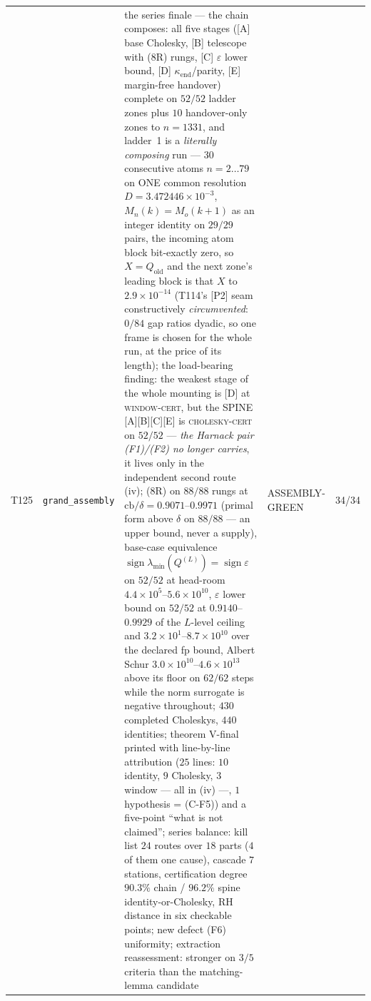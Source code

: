 \documentclass[11pt,a4paper]{article}
\begin{document}
{\begin{xltabular}{\linewidth}{@{}p{0.95cm} >{\raggedright\arraybackslash}p{3.1cm} Y >{\raggedright\scriptsize\arraybackslash}p{3.35cm} p{1.15cm}@{}}
T125 & \texttt{\scriptsize grand\_\allowbreak assembly} & the series finale --- the chain composes: all five stages ([A] base Cholesky, [B] telescope with (8R) rungs, [C] $\varepsilon$ lower bound, [D] $\kappa_{\mathrm{end}}$/parity, [E] margin-free handover) complete on $52/52$ ladder zones plus $10$ handover-only zones to $n=1331$, and ladder~1 is a \emph{literally composing} run --- $30$ consecutive atoms $n=2\ldots79$ on ONE common resolution $D=3.472446\times10^{-3}$, $M_n(k)=M_o(k+1)$ as an integer identity on $29/29$ pairs, the incoming atom block bit-exactly zero, so $X=Q_{\mathrm{old}}$ and the next zone's leading block is that $X$ to $2.9\times10^{-14}$ (T114's [P2] seam constructively \emph{circumvented}: $0/84$ gap ratios dyadic, so one frame is chosen for the whole run, at the price of its length); the load-bearing finding: the weakest stage of the whole mounting is [D] at \textsc{window-cert}, but the SPINE [A][B][C][E] is \textsc{cholesky-cert} on $52/52$ --- \emph{the Harnack pair (F1)/(F2) no longer carries}, it lives only in the independent second route (iv); (8R) on $88/88$ rungs at $\mathrm{cb}/\delta=0.9071$--$0.9971$ (primal form above $\delta$ on $88/88$ --- an upper bound, never a supply), base-case equivalence $\operatorname{sign}\lambda_{\min}(Q^{(L)})=\operatorname{sign}\varepsilon$ on $52/52$ at head-room $4.4\times10^{5}$--$5.6\times10^{10}$, $\varepsilon$ lower bound on $52/52$ at $0.9140$--$0.9929$ of the $L$-level ceiling and $3.2\times10^{1}$--$8.7\times10^{10}$ over the declared fp bound, Albert Schur $3.0\times10^{10}$--$4.6\times10^{13}$ above its floor on $62/62$ steps while the norm surrogate is negative throughout; $430$ completed Choleskys, $440$ identities; theorem V-final printed with line-by-line attribution ($25$ lines: $10$ identity, $9$ Cholesky, $3$ window --- all in (iv) ---, $1$ hypothesis = (C-F5)) and a five-point ``what is not claimed''; series balance: kill list $24$ routes over $18$ parts ($4$ of them one cause), cascade $7$ stations, certification degree $90.3\%$ chain / $\mathbf{96.2\%}$ spine identity-or-Cholesky, RH distance in six checkable points; new defect (F6) uniformity; extraction reassessment: stronger on $3/5$ criteria than the matching-lemma candidate & ASSEMBLY-GREEN & 34/34\\

\end{xltabular}}
\end{document}
